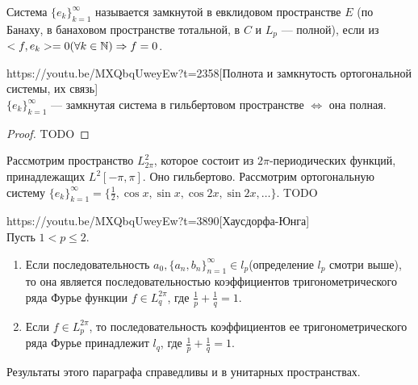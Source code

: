 \begin{Def}
	Система $\{e_k\}_{k=1}^\infty$ называется замкнутой в евклидовом пространстве $E$ (по Банаху, в банаховом пространстве тотальной, в $C$ и $L_p$ --- полной), если из ${<f,e_k>=0}\\{(\forall k\in \mathbb{N})}\Rightarrow f=0$.
\end{Def}

\begin{linkthm}{https://youtu.be/MXQbqUweyEw?t=2358}[Полнота и замкнутость ортогональной системы, их связь]\ \\
	$\{e_k\}_{k=1}^\infty$ --- замкнутая система в гильбертовом пространстве $\Leftrightarrow$ она полная.
\end{linkthm}
\begin{proof}
	TODO
\end{proof}

Рассмотрим пространство $L_{2\pi}^2$, которое состоит из $2\pi$-периодических функций, принадлежащих $L^2[-\pi,\pi]$. Оно гильбертово. Рассмотрим ортогональную систему $\{e_k\}_{k=1}^\infty=\{\frac{1}{2},\cos x,\sin x,\cos2x, \sin 2x,\ldots\}$.
TODO

\begin{linkthm}{https://youtu.be/MXQbqUweyEw?t=3890}[Хаусдорфа-Юнга]\ \\
	Пусть $1<p\leqslant 2$.
	\begin{enumerate}
		\item Если последовательность $a_0, \{a_n,b_n\}_{n=1}^\infty\in l_p$(определение $l_p$ смотри выше), то она является последовательностью коэффициентов тригонометрического ряда Фурье функции $f\in L_q^{2\pi}$, где $\frac{1}{p}+\frac{1}{q}=1$.
		\item Если $f\in L_p^{2\pi}$, то последовательность коэффициентов ее тригонометрического ряда Фурье принадлежит $l_q$, где $\frac{1}{p}+\frac{1}{q}=1$.
	\end{enumerate}
\end{linkthm}
\begin{note}
	Результаты этого параграфа справедливы и в унитарных пространствах.
\end{note}








